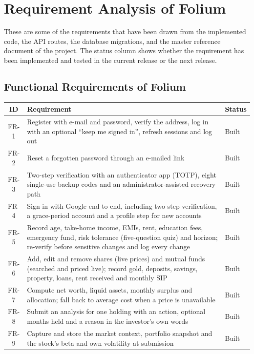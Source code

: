 \chapter{Requirement Analysis of Folium}
These are some of the requirements that have been drawn from the implemented code, the API routes, the database migrations, and the master reference document of the project. The status column shows whether the requirement has been implemented and tested in the current release or the next release.

\section{Functional Requirements of Folium}
\begin{table}[H]
\centering
\footnotesize
\renewcommand{\arraystretch}{1.1}
\begin{tabularx}{\textwidth}{|c|L|P{2.2cm}|}
\hline
\textbf{ID} & \textbf{Requirement} & \textbf{Status} \\
\hline
FR-1 & Register with e-mail and password, verify the address, log in with an optional ``keep me signed in'', refresh sessions and log out & Built \\
\hline
FR-2 & Reset a forgotten password through an e-mailed link & Built \\
\hline
FR-3 & Two-step verification with an authenticator app (TOTP), eight single-use backup codes and an administrator-assisted recovery path & Built \\
\hline
FR-4 & Sign in with Google end to end, including two-step verification, a grace-period account and a profile step for new accounts & Built \\
\hline
FR-5 & Record age, take-home income, EMIs, rent, education fees, emergency fund, risk tolerance (five-question quiz) and horizon; re-verify before sensitive changes and log every change & Built \\
\hline
FR-6 & Add, edit and remove shares (live prices) and mutual funds (searched and priced live); record gold, deposits, savings, property, loans, rent received and monthly SIP & Built \\
\hline
FR-7 & Compute net worth, liquid assets, monthly surplus and allocation; fall back to average cost when a price is unavailable & Built \\
\hline
FR-8 & Submit an analysis for one holding with an action, optional months held and a reason in the investor's own words & Built \\
\hline
FR-9 & Capture and store the market context, portfolio snapshot and the stock's beta and own volatility at submission & Built \\

\end{tabularx}
\end{table}

